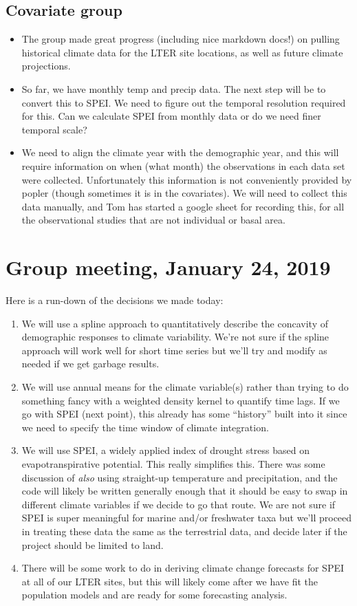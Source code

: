 \documentclass{article}
\begin{document}
\subsection{Covariate group}
\begin{itemize}
\item{The group made great progress (including nice markdown docs!) on pulling historical climate data for the LTER site locations, as well as future climate projections.}
\item{So far, we have monthly temp and precip data. The next step will be to convert this to SPEI. We need to figure out the temporal resolution required for this. Can we calculate SPEI from monthly data or do we need finer temporal scale?}
\item{We need to align the climate year with the demographic year, and this will require information on when (what month) the observations in each data set were collected. Unfortunately this information is not conveniently provided by popler (though sometimes it is in the covariates). We will need to collect this data manually, and Tom has started a google sheet for recording this, for all the observational studies that are not individual or basal area.}
\end{itemize}

\section{Group meeting, January 24, 2019}
Here is a run-down of the decisions we made today:
\begin{enumerate}
\item{We will use a spline approach to quantitatively describe the concavity of demographic responses to climate variability. We’re not sure if the spline approach will work well for short time series but we’ll try and modify as needed if we get garbage results. }
\item{We will use annual means for the climate variable(s) rather than trying to do something fancy with a weighted density kernel to quantify time lags. If we go with SPEI (next point), this already has some “history” built into it since we need to specify the time window of climate integration.}
\item{We will use SPEI, a widely applied index of drought stress based on evapotranspirative potential. This really simplifies this. There was some discussion of \textit{also} using straight-up temperature and precipitation, and the code will likely be written generally enough that it should be easy to swap in different climate variables if we decide to go that route. We are not sure if SPEI is super meaningful for marine and/or freshwater taxa but we’ll proceed in treating these data the same as the terrestrial data, and decide later if the project should be limited to land.}
\item{There will be some work to do in deriving climate change forecasts for SPEI at all of our LTER sites, but this will likely come after we have fit the population models and are ready for some forecasting analysis.}
\end{enumerate}
\end{document}
